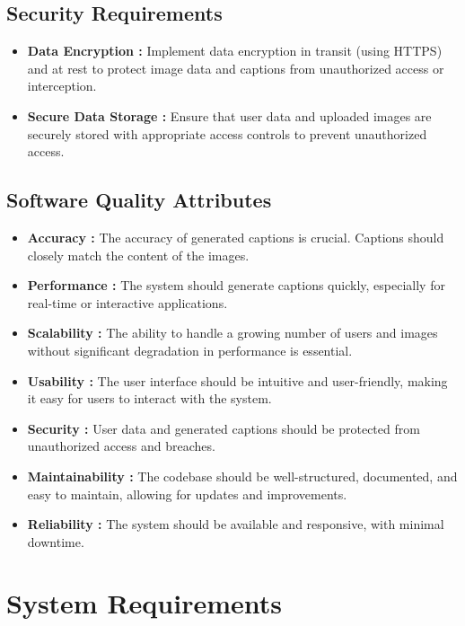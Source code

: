 \documentclass[oneside,a4paper,12pt]{report}
\begin{document}
\subsection{Security Requirements }
\begin{itemize}
\item \textbf{Data Encryption :}
Implement data encryption in transit (using HTTPS) and at rest to protect image data and captions from unauthorized access or interception.
\item \textbf{Secure Data Storage :}
Ensure that user data and uploaded images are securely stored with appropriate access controls to prevent unauthorized access.


\end{itemize}
\subsection{Software Quality Attributes }
\begin{itemize}
\item \textbf{Accuracy :}
The accuracy of generated captions is crucial. Captions should closely match the content of the images.

\item \textbf{Performance :}
The system should generate captions quickly, especially for real-time or interactive applications.

\item \textbf{Scalability :}
The ability to handle a growing number of users and images without significant degradation in performance is essential.

\item \textbf{Usability :}
The user interface should be intuitive and user-friendly, making it easy for users to interact with the system.

\item \textbf{Security :}
User data and generated captions should be protected from unauthorized access and breaches.

\item \textbf{Maintainability :}
The codebase should be well-structured, documented, and easy to maintain, allowing for updates and improvements.

\item \textbf{Reliability :}
The system should be available and responsive, with minimal downtime.

\end{itemize}
\section{System  Requirements }  
 
\end{document}
